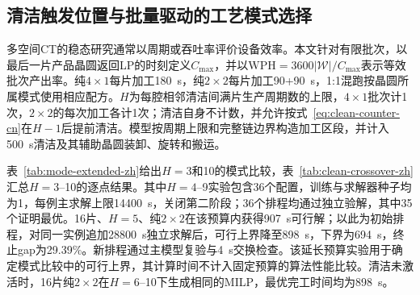 \documentclass[final,5p,times,twocolumn]{elsarticle}
\begin{document}
\subsection{清洁触发位置与批量驱动的工艺模式选择}

多空间CT的稳态研究通常以周期或吞吐率评价设备效率\citep{gu2024multifinger}。本文针对有限批次，以最后一片产品晶圆返回LP的时刻定义$C_{\max}$，并以$\mathrm{WPH}=3600|\mathcal W|/C_{\max}$表示等效批次产出率。纯$4\times1$每片加工180~s，纯$2\times2$每片加工90+90~s，1:1混跑按晶圆所属模式使用相应配方。$H$为每腔相邻清洁间满片生产周期数的上限，$4\times1$批次计1次，$2\times2$的每次加工各计1次；清洁自身不计数，并允许按式~\eqref{eq:clean-counter-cn}在$H-1$后提前清洁。模型按周期上限和完整链边界构造加工区段，并计入500~s清洁及其辅助晶圆装卸、旋转和搬运。

表~\ref{tab:mode-extended-zh}给出$H=3$和10的模式比较，表~\ref{tab:clean-crossover-zh}汇总$H=3$--10的逐点结果。其中$H=4$--9实验包含36个配置，训练与求解器种子均为1，每例主求解上限14400~s，关闭第二阶段；36个排程均通过独立验解，其中35个证明最优。16片、$H=5$、纯$2\times2$在该预算内获得907~s可行解；以此为初始排程，对同一实例追加28800~s独立求解后，可行上界降至898~s，下界为694~s，终止gap为29.39\%。新排程通过主模型复验与4~s交换检查。该延长预算实验用于确定模式比较中的可行上界，其计算时间不计入固定预算的算法性能比较。清洁未激活时，16片纯$2\times2$在$H=6$--10下生成相同的MILP，最优完工时间均为898~s。
\end{document}
